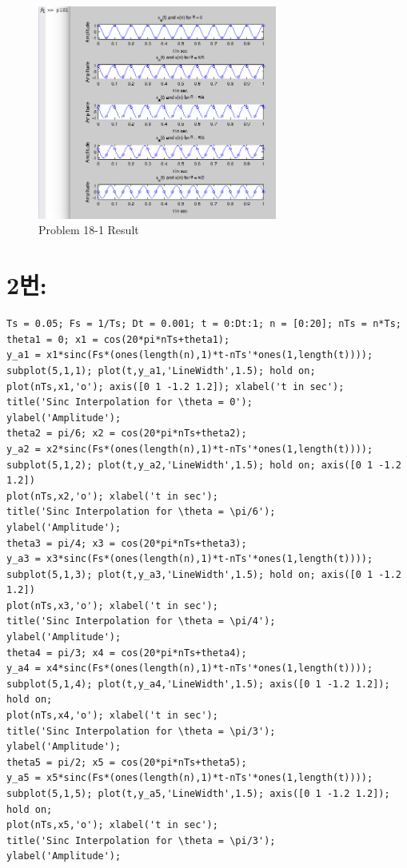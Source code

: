 \documentclass[11pt
  , a4paper
  , article
  , oneside
]{memoir}
\begin{document}
\begin{figure}[h!]
	\centering
	\includegraphics[width=0.7\textwidth,height=0.4\textwidth]{./images/p18-1.png}
	\caption{Problem 18-1 Result}
	\label{fig:Problem 18-1 Result}
\end{figure}

\clearpage

\section{2번: }
\begin{lstlisting}[style=termstyle]
%Problem 3.18-2
Ts = 0.05; Fs = 1/Ts; Dt = 0.001; t = 0:Dt:1; n = [0:20]; nTs = n*Ts;
theta1 = 0; x1 = cos(20*pi*nTs+theta1);
y_a1 = x1*sinc(Fs*(ones(length(n),1)*t-nTs'*ones(1,length(t))));
subplot(5,1,1); plot(t,y_a1,'LineWidth',1.5); hold on;
plot(nTs,x1,'o'); axis([0 1 -1.2 1.2]); xlabel('t in sec');
title('Sinc Interpolation for \theta = 0');
ylabel('Amplitude');
theta2 = pi/6; x2 = cos(20*pi*nTs+theta2);
y_a2 = x2*sinc(Fs*(ones(length(n),1)*t-nTs'*ones(1,length(t))));
subplot(5,1,2); plot(t,y_a2,'LineWidth',1.5); hold on; axis([0 1 -1.2 1.2])
plot(nTs,x2,'o'); xlabel('t in sec');
title('Sinc Interpolation for \theta = \pi/6');
ylabel('Amplitude');
theta3 = pi/4; x3 = cos(20*pi*nTs+theta3);
y_a3 = x3*sinc(Fs*(ones(length(n),1)*t-nTs'*ones(1,length(t))));
subplot(5,1,3); plot(t,y_a3,'LineWidth',1.5); hold on; axis([0 1 -1.2 1.2])
plot(nTs,x3,'o'); xlabel('t in sec');
title('Sinc Interpolation for \theta = \pi/4');
ylabel('Amplitude');
theta4 = pi/3; x4 = cos(20*pi*nTs+theta4);
y_a4 = x4*sinc(Fs*(ones(length(n),1)*t-nTs'*ones(1,length(t))));
subplot(5,1,4); plot(t,y_a4,'LineWidth',1.5); axis([0 1 -1.2 1.2]); hold on;
plot(nTs,x4,'o'); xlabel('t in sec');
title('Sinc Interpolation for \theta = \pi/3');
ylabel('Amplitude');
theta5 = pi/2; x5 = cos(20*pi*nTs+theta5);
y_a5 = x5*sinc(Fs*(ones(length(n),1)*t-nTs'*ones(1,length(t))));
subplot(5,1,5); plot(t,y_a5,'LineWidth',1.5); axis([0 1 -1.2 1.2]); hold on;
plot(nTs,x5,'o'); xlabel('t in sec');
title('Sinc Interpolation for \theta = \pi/3');
ylabel('Amplitude');
\end{lstlisting}
\end{document}
